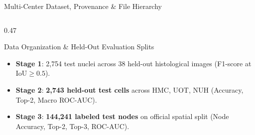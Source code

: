 \documentclass[aspectratio=169, 10pt]{beamer}
\begin{document}
\begin{frame}{Multi-Center Dataset, Provenance \& File Hierarchy}
\begin{columns}[onlytextwidth, t]
\begin{column}{0.47\textwidth}
\begin{block}{Data Organization \& Held-Out Evaluation Splits}
{\begin{itemize}
            \begin{itemize}\scriptsize
              \item \textbf{Stage 1}: 2,754 test nuclei across 38 held-out histological images (F1-score at $\text{IoU} \ge 0.5$).
              \item \textbf{Stage 2}: \textbf{2,743 held-out test cells} across HMC, UOT, NUH (Accuracy, Top-2, Macro ROC-AUC).
              \item \textbf{Stage 3}: \textbf{144,241 labeled test nodes} on official spatial split (Node Accuracy, Top-2, Top-3, ROC-AUC).
            \end{itemize}
        \end{itemize}
      }
    \end{block}
  \end{column}
\end{columns}
\end{frame}
\end{document}
